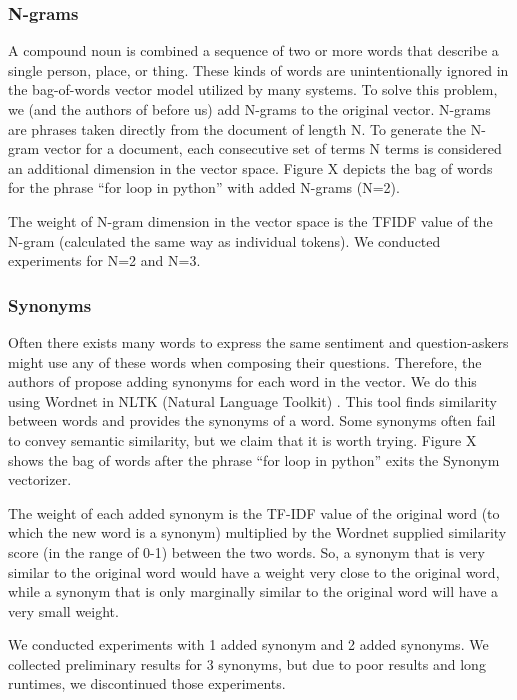 \documentclass{acm_proc_article-sp}
\begin{document}
\subsubsection{N-grams}
A compound noun is combined a sequence of two or more words that describe a single person, place, or thing. These kinds of words are unintentionally ignored in the bag-of-words vector model utilized by many systems. To solve this problem, we (and the authors of \cite{millar2006performance} before us) add N-grams to the original vector. N-grams are phrases taken directly from the document of length N.  To generate the N-gram vector for a document, each consecutive set of terms N terms is considered an additional dimension in the vector space. Figure X depicts the bag of words for the phrase ``for loop in python” with added N-grams (N=2).

The weight of N-gram dimension in the vector space is the TFIDF value of the N-gram (calculated the same way as individual tokens). We conducted experiments for N=2 and N=3. 

\subsubsection{Synonyms}
Often there exists many words to express the same sentiment and question-askers might use any of these words when composing their questions. Therefore, the authors of \cite{liu2009searching} propose adding synonyms for each word in the vector. We do this using Wordnet in NLTK (Natural Language Toolkit) \cite{bird2009natural}. This tool finds similarity between words and provides the synonyms of a word. Some synonyms often fail to convey semantic similarity, but we claim that it is worth trying. Figure X shows the bag of words after the phrase ``for loop in python” exits the Synonym vectorizer. 

The weight of each added synonym is the TF-IDF value of the original word (to which the new word is a synonym) multiplied by the Wordnet supplied similarity  score (in the range of 0-1) between the two words. So, a synonym that is very similar to the original word would have a weight very close to the original word, while a synonym that is only marginally similar to the original word will have a very small weight.

We conducted experiments with 1 added synonym and 2 added synonyms. We collected preliminary results for 3 synonyms, but due to poor results and long runtimes, we discontinued those experiments.
\end{document}
